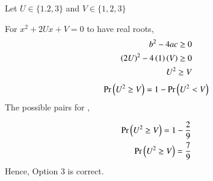 Let $U\in\{1.2,3\}$ and $V\in\{1,2,3\}$
\begin{table}[h!]
\centering
\caption{Probability of selecting values for $U$}
\label{june2013-60:Table1}
\end{table}
\begin{table}[h!]
\centering
\caption{Probability of selecting values for $V$}
\label{june2013-60:Table2}
\end{table}
For $x^2+2U x+V=0$ to have real roots,
\begin{align}
    b^2-4ac\geq0\\
    \left(2U\right)^2-4\left(1\right)\left(V\right)\geq0\\
    U^2\geq V
\end{align}
\begin{align}
    \Pr\left(U^2\geq V\right)=1-\Pr\left(U^2<V\right)
\end{align}
The possible pairs  for ,
\vspace{0.00001in}
\begin{table}[h!]
\centering
\caption{Table for }
\label{june2013-60:Table3}
\end{table}
\begin{align}
    \Pr\left(U^2\geq V\right)=1-\frac{2}{9}\\
    \Pr\left(U^2\geq V\right)=\frac{7}{9}
\end{align}
Hence, Option 3 is correct.
